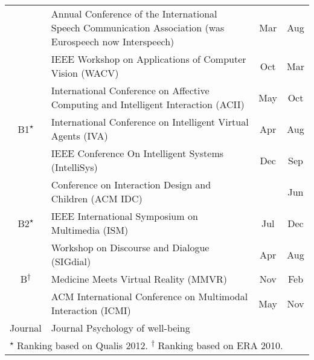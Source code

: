 \begin{sidewaystable}[]
\begin{tabular}{c  m{16cm}  c  c}
                                  & Annual Conference of the International Speech Communication Association (was Eurospeech now Interspeech) & Mar                & Aug        \\ \cmidrule{2-4}
                                  & IEEE Workshop on Applications of Computer Vision (WACV)                                                  & Oct                & Mar        \\ 
\midrule
\multirow{3}{*}{B1\textsuperscript{$\star$}}               & International Conference on Affective Computing and Intelligent Interaction (ACII)                       & May                & Oct        \\ \cmidrule{2-4}
                                  & International Conference on Intelligent Virtual Agents (IVA)                                             & Apr                & Aug        \\ \cmidrule{2-4}
                                  & IEEE Conference On Intelligent Systems (IntelliSys)                                                      & Dec                & Sep        \\ 
\midrule
\multirow{3}{*}{B2\textsuperscript{$\star$}}               & Conference on Interaction Design and Children (ACM IDC)                                                  &                    & Jun        \\ \cmidrule{2-4}
                                  & IEEE International Symposium on Multimedia (ISM)                                                         & Jul                & Dec        \\ \cmidrule{2-4}
                                  & Workshop on Discourse and Dialogue (SIGdial)                                                             & Apr                & Aug        \\ 
\midrule
B\textsuperscript{$\dagger$}                                 & Medicine Meets Virtual Reality (MMVR)                                                                    & Nov                & Feb        \\ \cmidrule{2-4}
                                  & ACM International Conference on Multimodal Interaction (ICMI)                                            & May                & Nov        \\ 
\midrule
Journal                           & Journal Psychology of well-being                                                                         &                    &           \\ 
\midrule[\heavyrulewidth]

\multicolumn{4}{l}{\footnotesize{\textsuperscript{$\star$} Ranking based on Qualis 2012. \textsuperscript{$\dagger$} Ranking based on ERA 2010.}} \\
	\bottomrule

\end{tabular}
\end{sidewaystable}

